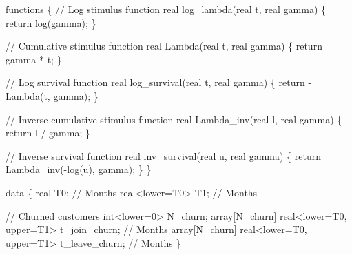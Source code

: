 \documentclass[
  letterpaper,
  DIV=11,
  numbers=noendperiod]{scrartcl}
\newenvironment{Shaded}{\begin{snugshade}}{\end{snugshade}}
\newcommand{\CommentTok}[1]{\textcolor[rgb]{0.37,0.37,0.37}{#1}}
\newcommand{\ControlFlowTok}[1]{\textcolor[rgb]{0.00,0.23,0.31}{#1}}
\newcommand{\DataTypeTok}[1]{\textcolor[rgb]{0.68,0.00,0.00}{#1}}
\newcommand{\DecValTok}[1]{\textcolor[rgb]{0.68,0.00,0.00}{#1}}
\newcommand{\KeywordTok}[1]{\textcolor[rgb]{0.00,0.23,0.31}{#1}}
\newcommand{\NormalTok}[1]{\textcolor[rgb]{0.00,0.23,0.31}{#1}}
\begin{document}
\begin{codelisting}

\caption{\texttt{model1.stan}}

\begin{Shaded}
\begin{Highlighting}[]
\KeywordTok{functions}\NormalTok{ \{}
  \CommentTok{// Log stimulus function}
  \DataTypeTok{real}\NormalTok{ log\_lambda(}\DataTypeTok{real}\NormalTok{ t, }\DataTypeTok{real}\NormalTok{ gamma) \{}
    \ControlFlowTok{return}\NormalTok{ log(gamma);}
\NormalTok{  \}}
  
  \CommentTok{// Cumulative stimulus function}
  \DataTypeTok{real}\NormalTok{ Lambda(}\DataTypeTok{real}\NormalTok{ t, }\DataTypeTok{real}\NormalTok{ gamma) \{}
    \ControlFlowTok{return}\NormalTok{ gamma * t;}
\NormalTok{  \}}

  \CommentTok{// Log survival function}
  \DataTypeTok{real}\NormalTok{ log\_survival(}\DataTypeTok{real}\NormalTok{ t, }\DataTypeTok{real}\NormalTok{ gamma) \{}
    \ControlFlowTok{return}\NormalTok{ {-}Lambda(t, gamma);}
\NormalTok{  \}}

  \CommentTok{// Inverse cumulative stimulus function}
  \DataTypeTok{real}\NormalTok{ Lambda\_inv(}\DataTypeTok{real}\NormalTok{ l, }\DataTypeTok{real}\NormalTok{ gamma) \{}
    \ControlFlowTok{return}\NormalTok{ l / gamma;}
\NormalTok{  \}}
  
  \CommentTok{// Inverse survival function}
  \DataTypeTok{real}\NormalTok{ inv\_survival(}\DataTypeTok{real}\NormalTok{ u, }\DataTypeTok{real}\NormalTok{ gamma) \{}
    \ControlFlowTok{return}\NormalTok{ Lambda\_inv({-}log(u), gamma);}
\NormalTok{  \}}
\NormalTok{\}}

\KeywordTok{data}\NormalTok{ \{}
  \DataTypeTok{real}\NormalTok{           T0; }\CommentTok{// Months}
  \DataTypeTok{real}\NormalTok{\textless{}}\KeywordTok{lower}\NormalTok{=T0\textgreater{} T1; }\CommentTok{// Months}

  \CommentTok{// Churned customers}
  \DataTypeTok{int}\NormalTok{\textless{}}\KeywordTok{lower}\NormalTok{=}\DecValTok{0}\NormalTok{\textgreater{} N\_churn;}
  \DataTypeTok{array}\NormalTok{[N\_churn] }\DataTypeTok{real}\NormalTok{\textless{}}\KeywordTok{lower}\NormalTok{=T0, }\KeywordTok{upper}\NormalTok{=T1\textgreater{} t\_join\_churn;  }\CommentTok{// Months}
  \DataTypeTok{array}\NormalTok{[N\_churn] }\DataTypeTok{real}\NormalTok{\textless{}}\KeywordTok{lower}\NormalTok{=T0, }\KeywordTok{upper}\NormalTok{=T1\textgreater{} t\_leave\_churn; }\CommentTok{// Months}
\NormalTok{\}}


\end{Highlighting}
\end{Shaded}
\end{codelisting}
\end{document}
